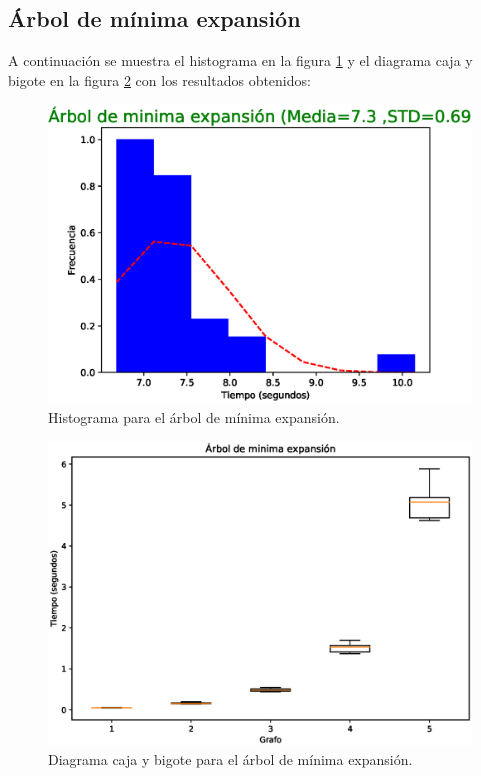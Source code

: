 \documentclass{article}
\begin{document}
\subsection{Árbol de mínima expansión}
A continuación se muestra el histograma en la figura \ref{fig:H5} y el diagrama caja y bigote en la figura \ref{fig:BP5} con los resultados obtenidos:
\begin{figure}[H]
    \includegraphics[width=\textwidth]{H5}
    \caption{Histograma para el árbol de mínima expansión.}
    \label{fig:H5}
\end{figure}
\begin{figure}[H]
    \includegraphics[width=\textwidth]{BP5}
    \caption{Diagrama caja y bigote para el árbol de mínima expansión.}
    \label{fig:BP5}
\end{figure}
\end{document}
